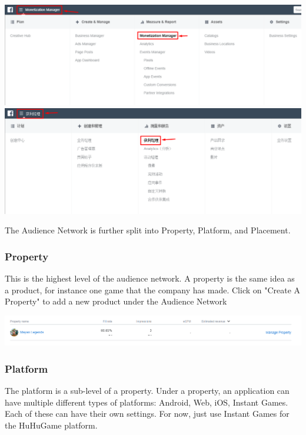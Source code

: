 \documentclass{article}
\begin{document}
\begin{center}
\includegraphics[width = \textwidth]{images/AudienceNetworkEnglish.png}
\includegraphics[width = \textwidth]{images/AudienceNetworkChinese.png}
\end{center}

The Audience Network is further split into Property, Platform, and Placement. 

\subsubsection{Property}
This is the highest level of the audience network. A property is the same idea as a product, for instance one game that the company has made. Click on "Create A Property" to add a new product under the Audience Network

\begin{center}
\includegraphics[width = \textwidth]{images/Property.png}
\end{center}

\subsubsection{Platform}
The platform is a sub-level of a property. Under a property, an application can have multiple different types of platforms: Android, Web, iOS, Instant Games. Each of these can have their own settings. For now, just use Instant Games for the HuHuGame platform.
\end{document}
